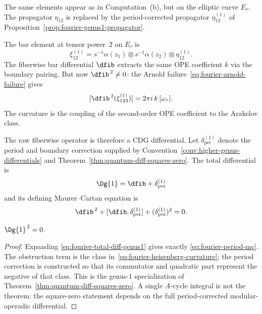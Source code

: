 The same elements appear as in Computation~(b), but on the elliptic
curve $E_\tau$. The propagator $\eta_{12}$ is replaced by the
period-corrected propagator $\eta^{(1)}_{12}$ of
Proposition~\ref{prop:fourier-genus1-propagator}.

\begin{computation}
\label{comp:fourier-heisenberg-elliptic}
The bar element at tensor power~$2$ on $E_\tau$ is
\[
\xi^{(1)}_{12} = s^{-1}\alpha(z_1) \otimes s^{-1}\alpha(z_2)
 \otimes \eta^{(1)}_{12}.
\]
The fiberwise bar differential $\dfib$ extracts the same OPE
coefficient $k$ via the boundary pairing. But now
$\dfib^{\,2} \neq 0$: the Arnold
failure~\eqref{eq:fourier-arnold-failure} gives
\begin{equation}\label{eq:fourier-heisenberg-curvature}
[\dfib^{\,2}(\xi^{(1)}_{123})]
=2\pi i\,k\,[\omega_\tau].
\end{equation}
The curvature is the coupling of the second-order OPE coefficient to
the Arakelov class.

The raw fiberwise operator is therefore a CDG differential. Let
$\delta_{\mathrm{per}}^{(1)}$ denote the period and boundary
correction supplied by Convention~\ref{conv:higher-genus-differentials}
and Theorem~\ref{thm:quantum-diff-squares-zero}. The total
differential is
\begin{equation}\label{eq:fourier-total-diff-genus1}
\Dg{1}=\dfib+\delta_{\mathrm{per}}^{(1)}
\end{equation}
and its defining Maurer--Cartan equation is
\begin{equation}\label{eq:fourier-period-mc}
\dfib^{\,2}+[\dfib,\delta_{\mathrm{per}}^{(1)}]
+(\delta_{\mathrm{per}}^{(1)})^2=0.
\end{equation}
\end{computation}

\begin{proposition}[\ClaimStatusConditional]
\label{prop:fourier-total-diff-nilpotent}
$\Dg{1}^{\,2} = 0$.
\end{proposition}

\begin{proof}
Expanding \eqref{eq:fourier-total-diff-genus1} gives exactly
\eqref{eq:fourier-period-mc}. The obstruction term is the class
in~\eqref{eq:fourier-heisenberg-curvature}; the period correction is
constructed so that its commutator and quadratic part represent the
negative of that class. This is the genus-$1$ specialization of
Theorem~\ref{thm:quantum-diff-squares-zero}. A single
$A$-cycle integral is not the theorem: the square-zero statement
depends on the full period-corrected modular-operadic differential.
\end{proof}

